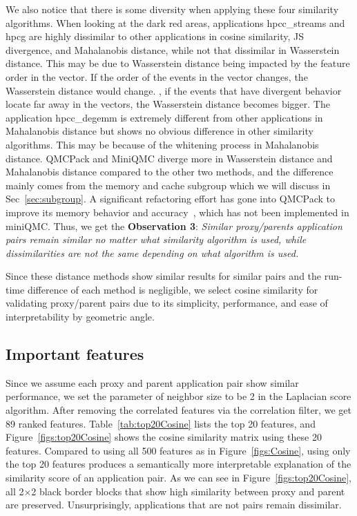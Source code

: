 We also notice that there is some diversity when applying these four similarity algorithms. When looking at the dark red areas, applications hpcc\_streams and hpcg are highly dissimilar to other applications in cosine similarity, JS divergence, and Mahalanobis distance, while not that dissimilar in Wasserstein distance. This may be due to Wasserstein distance being impacted by the feature order in the vector. If the order of the events in the vector changes, the Wasserstein distance would change. \eg, if the events that have divergent behavior locate far away in the vectors, the Wasserstein distance becomes bigger. The application hpcc\_degemm is extremely different from other applications in Mahalanobis distance but shows no obvious difference in other similarity algorithms. This may be because of the whitening process in Mahalanobis distance. QMCPack and MiniQMC diverge more in Wasserstein distance and Mahalanobis distance compared to the other two methods, and the difference mainly comes from the memory and cache subgroup which we will discuss in Sec~\ref{sec:subgroup}. A significant refactoring effort has gone into QMCPack to improve its memory
behavior and accuracy~\cite{qmcpack}, which has not been implemented in miniQMC.
Thus, we get the \textbf{Observation 3}: \textit{Similar proxy/parents application pairs remain similar no matter what similarity algorithm is used, while dissimilarities are not the same depending on what algorithm is used.}

Since these distance methods show similar results for similar pairs and the run-time difference of each method is negligible, we select cosine similarity for validating proxy/parent pairs due to its simplicity, performance, and ease of interpretability by geometric angle.

\subsection{Important features}
Since we assume %
each proxy and parent application pair show similar performance, we set the parameter of neighbor size to be 2 in the Laplacian score algorithm. After removing the correlated features via the correlation filter, we get 89 ranked features. Table~\ref{tab:top20Cosine} lists the top 20 features, and Figure~\ref{figs:top20Cosine} shows the cosine similarity matrix using these 20 features. Compared to using all 500 features as in Figure~\ref{figs:Cosine}, using only the top 20 features produces a semantically more interpretable explanation of the similarity score of an application pair. As we can see in Figure~\ref{figs:top20Cosine}, all 2$\times$2 black border blocks that show high similarity between proxy and parent are preserved. Unsurprisingly, applications that are not pairs remain dissimilar.%

